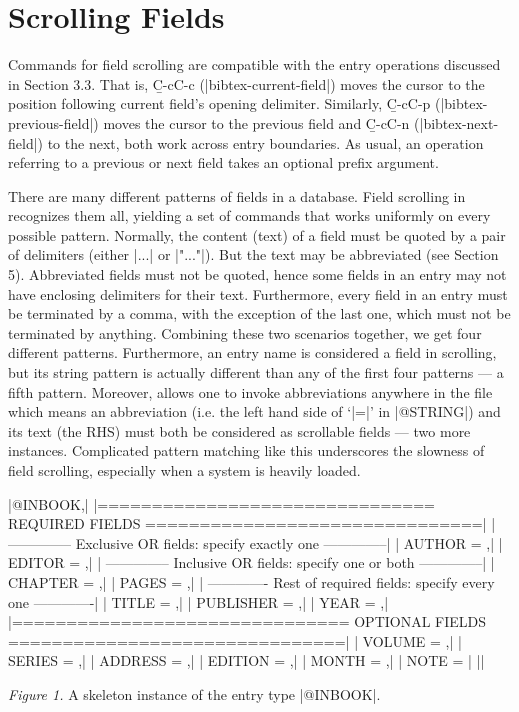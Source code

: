 \section{Scrolling Fields}

\noindent
Commands for field scrolling are compatible with the entry operations
discussed in Section 3.3.  That is, {\b C-c{\s}C-c}
(|bibtex-current-field|) moves the cursor to the position following
current field's opening delimiter.  Similarly, {\b C-c{\s}C-p} 
(|bibtex-previous-field|) moves the cursor to the previous field and 
{\b C-c{\s}C-n} \hbox{(|bibtex-next-field|)} to the next, both work
across entry boundaries.
As usual, an operation referring to a previous or next field takes an optional 
prefix argument.

There are many different patterns of fields in a {\BibTeX} database.  
Field scrolling in {\BM} recognizes them all, yielding a set of commands
that works uniformly on every possible pattern.
Normally, the content (text) of a field must be quoted by a pair
of delimiters (either |{...}| or |"..."|).
But the text may be abbreviated (see Section 5).  Abbreviated fields must
not be quoted, hence some fields in an entry may not have enclosing delimiters
for their text.
Furthermore, every field in an entry must be terminated by a comma,
with the exception of the last one, which must not be terminated by anything.
Combining these two scenarios together, we get four different patterns.
Furthermore, an entry name is considered a field in scrolling, but
its string pattern is actually different than any of the first four patterns
--- a fifth pattern.  Moreover, {\BM} allows one to invoke
abbreviations anywhere in the file which means an abbreviation
(i.e. the left hand side of `|=|' in |@STRING|) 
and its text (the RHS) must both be considered as scrollable fields 
--- two more instances.  
Complicated pattern matching like this underscores the slowness
of field scrolling, especially when a system is heavily loaded.

\topinsert
\begindisplay
|@INBOOK{,|\cr
|=============================== REQUIRED FIELDS ===============================|\cr
|    -------------- Exclusive OR fields: specify exactly one --------------|\cr
|    AUTHOR = {},|\cr
|    EDITOR = {},|\cr
|    -------------- Inclusive OR fields: specify one or both --------------|\cr
|    CHAPTER = {},|\cr
|    PAGES = {},|\cr
|    ------------- Rest of required fields: specify every one -------------|\cr
|    TITLE = {},|\cr
|    PUBLISHER = {},|\cr
|    YEAR = {},|\cr
|=============================== OPTIONAL FIELDS ===============================|\cr
|    VOLUME = {},|\cr
|    SERIES = {},|\cr
|    ADDRESS = {},|\cr
|    EDITION = {},|\cr
|    MONTH = ,|\cr
|    NOTE = {}|\cr
|}|\cr
\enddisplay
\centerline{{\it Figure 1.\/} A skeleton instance of the entry type |@INBOOK|.}
\endinsert

